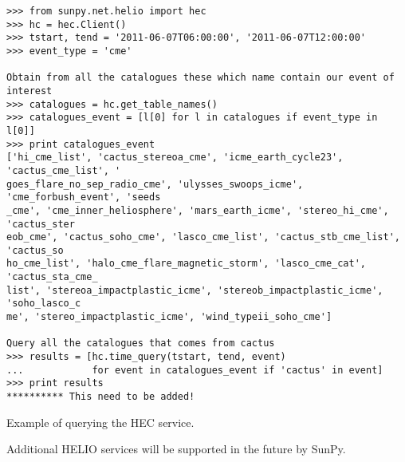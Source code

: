 \begin{listing}[h]
\begin{verbatim}
>>> from sunpy.net.helio import hec
>>> hc = hec.Client()
>>> tstart, tend = '2011-06-07T06:00:00', '2011-06-07T12:00:00'
>>> event_type = 'cme'

Obtain from all the catalogues these which name contain our event of interest
>>> catalogues = hc.get_table_names()
>>> catalogues_event = [l[0] for l in catalogues if event_type in l[0]]
>>> print catalogues_event
['hi_cme_list', 'cactus_stereoa_cme', 'icme_earth_cycle23', 'cactus_cme_list', '
goes_flare_no_sep_radio_cme', 'ulysses_swoops_icme', 'cme_forbush_event', 'seeds
_cme', 'cme_inner_heliosphere', 'mars_earth_icme', 'stereo_hi_cme', 'cactus_ster
eob_cme', 'cactus_soho_cme', 'lasco_cme_list', 'cactus_stb_cme_list', 'cactus_so
ho_cme_list', 'halo_cme_flare_magnetic_storm', 'lasco_cme_cat', 'cactus_sta_cme_
list', 'stereoa_impactplastic_icme', 'stereob_impactplastic_icme', 'soho_lasco_c
me', 'stereo_impactplastic_icme', 'wind_typeii_soho_cme']

Query all the catalogues that comes from cactus
>>> results = [hc.time_query(tstart, tend, event) 
...            for event in catalogues_event if 'cactus' in event]
>>> print results
********** This need to be added!
\end{verbatim}
\caption{Example of querying the HEC service.}
\label{code:helio}
\end{listing}

Additional HELIO services will be supported in the future by SunPy.
